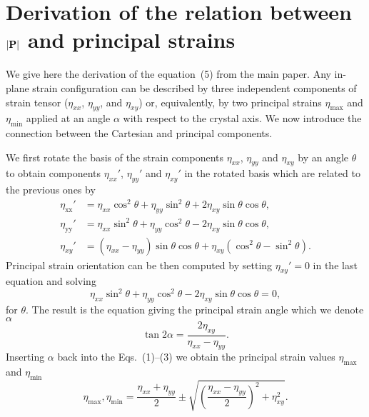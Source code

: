 \chapter{Derivation of the relation between $|{\bf P}|$ and principal strains}

We give here the derivation of the equation~(5) from the main paper.
%
%
%
Any in-plane strain configuration can be described by three independent components of strain tensor ($\eta_{xx}$, $\eta_{yy}$, and $\eta_{xy}$) or, equivalently, by two principal strains $\eta_\mathrm{max}$ and $\eta_\mathrm{min}$ applied at an angle $\alpha$ with respect to the crystal axis. We now introduce the connection between the Cartesian and principal components.
%
%

We first rotate the basis of the strain components $\eta_{xx}$, $\eta_{yy}$ and $\eta_{xy}$ by an angle $\theta$ to obtain components $\eta_{xx}'$, $\eta_{yy}'$ and $\eta_{xy}'$ in the rotated basis which are related to the previous ones by
%
\begin{align}
\eta_\mathrm{xx}' &= \eta_{xx}\cos^2{\theta}+\eta_{yy}\sin^2{\theta}+2\eta_{xy}\sin{\theta}\cos{\theta} , \\
\eta_\mathrm{yy}' &=\eta_{xx}\sin^2{\theta}+\eta_{yy}\cos^2{\theta}-2\eta_{xy}\sin{\theta}\cos{\theta}, \\
\eta_{xy}' &=\left(\eta_{xx}-\eta_{yy}\right)\sin{\theta}\cos{\theta}+\eta_{xy}\left(\cos^2{\theta}-\sin^2{\theta}\right).
\end{align}
%
%
%
%
Principal strain orientation can be then computed by setting $\eta_{xy}'=0$ in the last equation and solving
%
%
\begin{equation}
\eta_{xx}\sin^2{\theta}+\eta_{yy}\cos^2{\theta}-2\eta_{xy}\sin{\theta}\cos{\theta}=0,
\end{equation}
%
%
for $\theta$. The result is the equation giving the principal strain angle which we denote $\alpha$
%
%
\begin{equation}
\tan{2\alpha}=\frac{2\eta_{xy}}{\eta_{xx}-\eta_{yy}}\label{eq:principal_angle}.
\end{equation}
%
Inserting $\alpha$ back into the Eqs.~(1)--(3) we obtain the principal strain values $\eta_\mathrm{max}$ and $\eta_\mathrm{min}$
%
%
\begin{equation}
\eta_\mathrm{max}, \eta_\mathrm{min} = \frac{\eta_{xx}+\eta_{yy}}{2} \pm \sqrt{\left(\frac{\eta_{xx}-\eta_{yy}}{2}\right)^2+\eta_{xy}^2}. \label{eq:princip_strain}
\end{equation}
%
%



